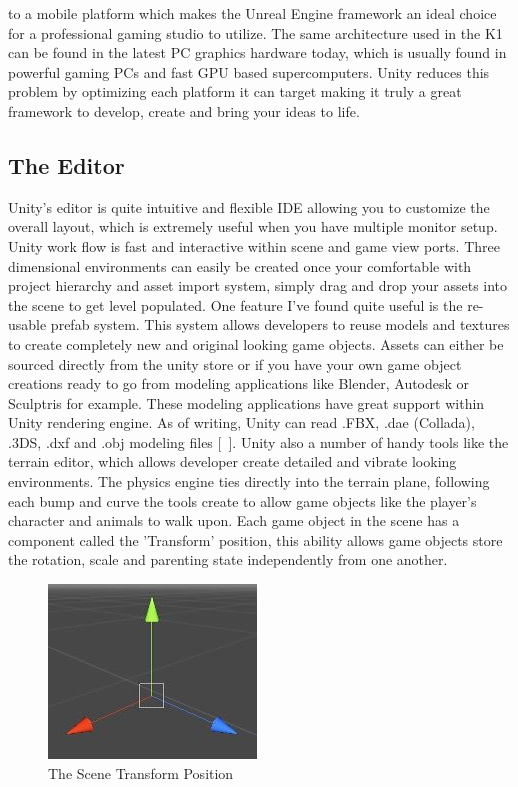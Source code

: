 to a mobile platform which makes the Unreal Engine framework an ideal choice for a professional gaming studio to utilize. The same architecture used in the K1 can be found in the latest PC graphics hardware today, which is usually found in powerful gaming PCs and fast GPU based supercomputers. Unity reduces this problem by optimizing each platform it can target making it truly a great framework to develop, create and bring your ideas to life.
\subsection{The Editor}
Unity's editor is quite intuitive and flexible IDE allowing you to customize the overall layout, which is extremely useful when you have multiple monitor setup. Unity work flow is fast and interactive within scene and game view ports. Three dimensional environments can easily be created once your comfortable with project hierarchy and asset import system, simply drag and drop your assets into the scene to get level populated. One feature I've found quite useful is the re-usable prefab system. This system allows developers to reuse models and textures to create completely new and original looking game objects. Assets can either be sourced directly from the unity store or if you have your own game object creations ready to go from modeling applications like Blender, Autodesk or Sculptris for example. These modeling applications have great support within Unity rendering engine. As of writing, Unity can read .FBX, .dae (Collada), .3DS, .dxf and .obj modeling files [~\cite{Unity-Models-Support}]. Unity also a number of handy tools like the terrain editor, which allows developer create detailed and vibrate looking environments. The physics engine ties directly into the terrain plane, following each bump and curve the tools create to allow game objects like the player's character and animals to walk upon. Each game object in the scene has a component called the 'Transform' position, this ability allows game objects store the rotation, scale and parenting state independently from one another. 

\begin{figure}[!ht]
	\caption{The Scene Transform Position}
	\centering
	\includegraphics{img/transform.jpg}
\end{figure}

